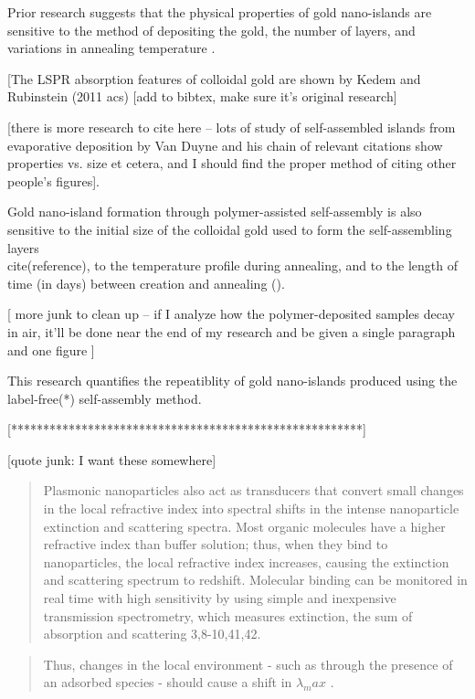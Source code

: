 \documentclass[12pt,oneside,english]{article}
\begin{document}
    Prior research suggests that the physical properties of gold nano-islands are sensitive to the method of depositing the gold, the number of layers, and variations in annealing temperature \cite{shon11}.

    [The LSPR absorption features of colloidal gold are shown by Kedem and Rubinstein (2011 acs) [add to bibtex, make sure it's original research]

 [there is more research to cite here -- lots of study of self-assembled islands from evaporative deposition by Van Duyne and his chain of relevant citations show properties vs. size et cetera, and I should find the proper method of citing other people's figures].  


    Gold nano-island formation through polymer-assisted self-assembly is also sensitive to the initial size of the colloidal gold used to form the self-assembling layers \\cite(reference), to the temperature profile during annealing, and to the length of time (in days) between creation and annealing (\cite{joshi}).

    [ more junk to clean up -- if I analyze how the polymer-deposited samples decay in air, it'll be done near the end of my research and be given a single paragraph and one figure ]
    
    This research quantifies the repeatiblity of gold nano-islands produced using the label-free(*) self-assembly method.

[*******************************************************]

    [quote junk: I want these somewhere]
    
    \begin{quote}
    Plasmonic nanoparticles also act as transducers that convert small changes in the local refractive index into spectral shifts in the intense nanoparticle extinction and scattering spectra. 
    Most organic molecules have a higher refractive index than buffer solution; thus, when they bind to nanoparticles, the local refractive index increases, causing the extinction and scattering spectrum to redshift. 
    Molecular binding can be monitored in real time with high sensitivity by using simple and inexpensive transmission spectrometry, which measures extinction, the sum of absorption and scattering 3,8-10,41,42. 
    \cite{nature2008}
    \end{quote}

    \begin{quote}
    Thus, changes in the local environment - such as through the presence of an adsorbed species - should cause a shift in $\lambda_max$ .
    \cite{willets2006}
    \end{quote}
\end{document}
